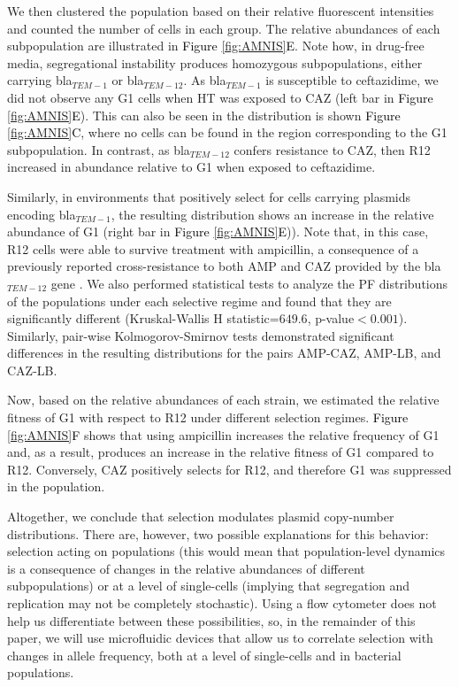 \documentclass[fleqn,12pt]{wlscirep}
\newcommand{\fig}[1]{\textcolor{black}{#1}}
\begin{document}
We then clustered the population based on their relative fluorescent intensities and counted the number of cells in each group. The relative abundances of each subpopulation are illustrated in \fig{Figure \ref{fig:AMNIS}E}. Note how, in drug-free media, segregational instability produces homozygous subpopulations, either carrying bla$_{TEM-1}$ or bla$_{TEM-12}$.
As bla$_{TEM-1}$ is susceptible to ceftazidime, we did not observe any G1 cells when HT was exposed to CAZ (left bar in \fig{Figure \ref{fig:AMNIS}E}).  This can also be seen in the distribution is shown \fig{Figure \ref{fig:AMNIS}C}, where no cells can be found in the region corresponding to the G1 subpopulation. In contrast, as  bla$_{TEM-12}$ confers resistance to CAZ, then R12 increased in abundance relative to G1 when exposed to ceftazidime.

Similarly, in environments that positively select for cells carrying plasmids encoding bla$_{TEM-1}$, the resulting distribution shows an increase in the relative abundance of G1 (right bar in \fig{Figure \ref{fig:AMNIS}E})).
Note that, in this case, R12 cells were able to survive treatment with ampicillin, a consequence of a previously reported cross-resistance to both AMP and CAZ provided by the {bla}$_{TEM-12}$ gene \cite{Rodriguez2018,salverda2010natural}.
We also performed statistical tests to analyze the PF distributions of the populations under each selective regime and found that they are significantly different (Kruskal-Wallis H statistic=$649.6$, p-value$<0.001$). Similarly, pair-wise Kolmogorov-Smirnov tests demonstrated significant differences in the resulting distributions for the pairs AMP-CAZ, AMP-LB, and CAZ-LB.
  
Now, based on the relative abundances of each strain, we estimated the relative fitness of G1 with respect to R12 under different selection regimes.  \fig{Figure \ref{fig:AMNIS}F} shows that using ampicillin increases the relative frequency of G1 and, as a result, produces an increase in the relative fitness of G1 compared to R12.  Conversely, CAZ positively selects for R12, and therefore G1 was suppressed in the population.

Altogether, we conclude that selection modulates plasmid copy-number distributions.  There are, however, two possible explanations for this behavior: selection acting on populations (this would mean that population-level dynamics is a consequence of changes in the relative abundances of different subpopulations) or at a level of single-cells (implying that segregation and replication may not be completely stochastic).  Using a flow cytometer does not help us differentiate between these possibilities, so, in the remainder of this paper, we will use microfluidic devices that allow us to correlate selection with changes in allele frequency, both at a level of single-cells and in bacterial populations.
\end{document}

